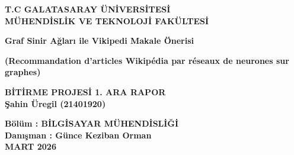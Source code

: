 \begin{titlepage}
    \begin{center}
    	\large
        \vspace{-0.5cm}
    	\textbf{T.C GALATASARAY ÜN\.{I}VERS\.{I}TES\.{I}}\\
        \textbf{MÜHEND\.{I}SL\.{I}K VE TEKNOLOJ\.{I} FAKÜLTES\.{I}}
        \vspace{3.0cm}
        
        \textbf{Graf Sinir Ağları ile Vikipedi Makale Önerisi}
        
        \textbf{(Recommandation d'articles Wikipédia par réseaux de neurones sur graphes)}
        
        \vspace{1.5cm}
        
        \textbf{B\.{I}T\.{I}RME PROJES\.{I} 1. ARA RAPOR}\\
        
        \textbf{Şahin Üregil (21401920)}
       
        \vspace{1.5cm}
      
        
        \textbf{Bölüm : B\.{I}LG\.{I}SAYAR MÜHEND\.{I}SL\.{I}\u{G}\.{I}}\\
        \textbf{Dan{\i}\c{s}man : Günce Keziban Orman}\\
        \vfill
        \textbf{MART 2026}
       
    \end{center}
\end{titlepage}
\restoregeometry